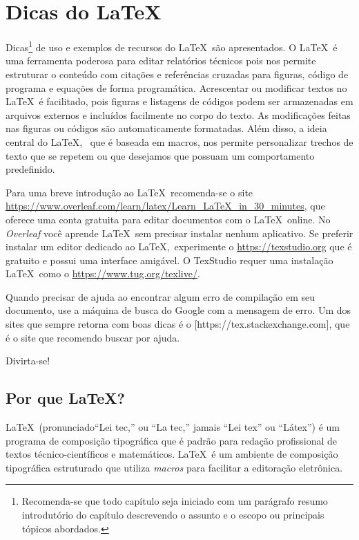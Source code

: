 \graphicspath{{figuras/}}

\chapter{Dicas do \LaTeX}
\label{cap2}

Dicas\footnote{Recomenda-se que todo capítulo seja iniciado com um parágrafo resumo introdutório do capítulo descrevendo o assunto e o escopo ou principais tópicos abordados.} de uso e exemplos de recursos do \LaTeX\ são apresentados. O \LaTeX\   é uma ferramenta poderosa para editar relatórios técnicos pois nos permite estruturar o conteúdo com citações e referências cruzadas para figuras, código de programa e equações de forma programática. Acrescentar ou modificar textos no \LaTeX\ é facilitado, pois figuras e listagens de códigos podem ser armazenadas em arquivos externos e incluídos facilmente no corpo do texto. As modificações feitas nas figuras ou códigos são automaticamente formatadas. Além disso, a ideia central do \LaTeX, \, que é baseada em macros, nos permite personalizar trechos de texto que se repetem ou que desejamos que possuam um comportamento predefinido. 

Para uma breve introdução ao \LaTeX\ recomenda-se o site  \url{https://www.overleaf.com/learn/latex/Learn_LaTeX_in_30_minutes}, que oferece uma conta gratuita para editar documentos  com o \LaTeX\ online. No \emph{Overleaf} você aprende \LaTeX\ sem precisar instalar nenhum aplicativo. Se preferir instalar um editor dedicado ao \LaTeX,\,  experimente  o \url{https://texstudio.org} que é gratuito e possui uma interface amigável. O TexStudio requer uma instalação \LaTeX\ como o \url{https://www.tug.org/texlive/}.

Quando precisar de ajuda ao encontrar algum erro de compilação em seu documento, use a máquina de busca do Google com a mensagem de erro. Um dos sites que sempre retorna com boas dicas é o [https://tex.stackexchange.com], que é o site que recomendo buscar por ajuda. 

Divirta-se!

\section{Por que \LaTeX?}
\LaTeX\ (pronunciado``Lei tec,'' ou ``La tec,'' jamais ``Lei tex'' ou ``Látex'') é um programa de composição tipográfica que é padrão para redação profissional de textos técnico-científicos e matemáticos. \LaTeX\ é um ambiente de composição tipográfica  estruturado  que utiliza \emph{macros} para facilitar a editoração eletrônica. 

